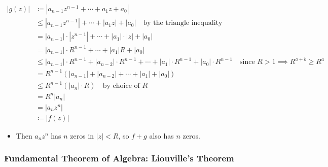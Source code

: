 \begin{align*} |g(z)|  &\coloneqq|a_{n-1}z^{n-1} + \cdots + a_1 z + a_0 | \\ &\leq |a_{n-1}z^{n-1}| + \cdots + |a_1 z| + |a_0 | \quad\text{by the triangle inequality} \\ &= |a_{n-1}|\cdot |z^{n-1}| + \cdots + |a_1|\cdot| z| + |a_0 | \\ &=  |a_{n-1}|\cdot R^{n-1} + \cdots + |a_1| R + |a_0 | \\ &\leq |a_{n-1}|\cdot R^{n-1}+|a_{n-2}|\cdot R^{n-1} + \cdots + |a_1| \cdot R^{n-1} + |a_0 |\cdot R^{n-1} \quad\text{since } R>1 \implies R^{a+b} \geq R^a \\ &= R^{n-1} \left( |a_{n-1}| + |a_{n-2}| + \cdots + |a_1| + |a_0| \right) \\ &\leq R^{n-1} \left( |a_n|\cdot R \right) \quad\text{by choice of } R   \\ &= R^{n} |a_n| \\ &= |a_n z^n| \\ &\coloneqq|f(z)| \end{align*}

\begin{itemize}
\tightlist
\item
  Then \(a_n z^n\) has \(n\) zeros in
  \({\left\lvert {z} \right\rvert} < R\), so \(f+g\) also has \(n\)
  zeros.
\end{itemize}

\hypertarget{fundamental-theorem-of-algebra-liouvilles-theorem}{%
\subsubsection{Fundamental Theorem of Algebra: Liouville's
Theorem}\label{fundamental-theorem-of-algebra-liouvilles-theorem}}

